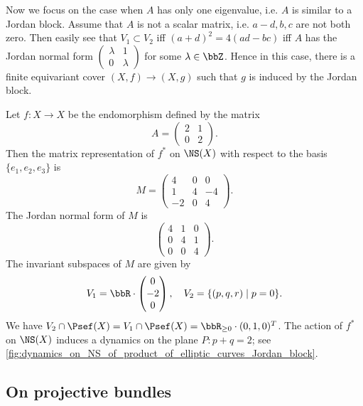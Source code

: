     Now we focus on the case when \(A\) has only one eigenvalue, i.e. \(A\) is similar to a Jordan block.
    Assume that \(A\) is not a scalar matrix, i.e. \(a-d,b,c\) are not both zero.
    Then easily see that \(V_1 \subset V_2\) iff \((a+d)^2 = 4(ad-bc)\) iff \(A\) has the Jordan normal form \(\begin{pmatrix}
        \lambda & 1 \\
        0 & \lambda
    \end{pmatrix}\) for some \(\lambda \in \bbZ\).
    Hence in this case, there is a finite equivariant cover \((X,f) \to (X,g)\) such that \(g\) is induced by the Jordan block.

    \begin{example}\label{eg:Jordan_block_acts_on_NS_by_endomorphism_of_product_of_elliptic_curves}
        Let \(f: X \to X\) be the endomorphism defined by the matrix
        \[ A = \begin{pmatrix}
            2 & 1 \\
            0 & 2
        \end{pmatrix}. \]
        Then the matrix representation of \(f^*\) on \(\NS(X)\) with respect to the basis \(\{e_1, e_2, e_3\}\) is
        \[
            M = \begin{pmatrix}
                4 & 0 & 0 \\
                1 & 4 & -4 \\
                -2 & 0 & 4
            \end{pmatrix}.
        \]
        The Jordan normal form of \(M\) is
        \[
            \begin{pmatrix}
                4 & 1 & 0 \\
                0 & 4 & 1 \\
                0 & 0 & 4
            \end{pmatrix}.
        \]
        The invariant subspaces of \(M\) are given by
        \[ V_1 = \bbR \cdot \begin{pmatrix}
            0 \\
            -2 \\
            0
        \end{pmatrix}, \quad V_2 = \{(p,q,r) \mid p = 0\}. \]
        We have \(V_2 \cap \Psef(X) = V_1 \cap \Psef(X) = \bbR_{\geq 0} \cdot (0,1,0)^T\).
        The action of \(f^*\) on \(\NS(X)\) induces a dynamics on the plane \(P: p+q=2\); see \cref{fig:dynamics_on_NS_of_product_of_elliptic_curves_Jordan_block}.
    \end{example}


\subsection{On projective bundles}
